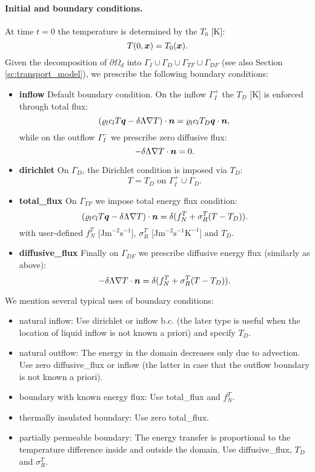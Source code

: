 


\paragraph{Initial and boundary conditions.}
At time $t=0$ the temperature is determined by the  $T_0$ [K]:
\[ T(0,\mathbf{\boldsymbol{x}}) = T_0(\mathbf{\boldsymbol{x}}). \]
Given the decomposition of $\partial\Omega_d$ into $\Gamma_I\cup\Gamma_D\cup\Gamma_{TF}\cup\Gamma_{DF}$ (see also Section \ref{sc:transport_model}), we prescribe the following boundary conditions:
\begin{itemize}
\item \textbf{inflow} Default boundary condition. On the inflow $\Gamma_I^+$ the  $T_D$ [K] is enforced through total flux:
\[ \left(\varrho_l c_l T \mathbf{\boldsymbol{q}} - \delta\Lambda\nabla T\right)\cdot\mathbf{\boldsymbol{n}} = \varrho_l c_l T_D\mathbf{\boldsymbol{q}}\cdot\mathbf{\boldsymbol{n}}, \]
while on the outflow $\Gamma_I^-$ we prescribe zero diffusive flux:
\[ -\delta\Lambda\nabla T\cdot\mathbf{\boldsymbol{n}} = 0. \] 
\item \textbf{dirichlet} On $\Gamma_D$, the Dirichlet condition is imposed via  $T_D$:
\[ T = T_D \mbox{ on }\Gamma_I^+\cup\Gamma_D. \]
\item \textbf{total\_flux}
On $\Gamma_{TF}$ we impose total energy flux condition:
\[ \left(\varrho_l c_l T \mathbf{\boldsymbol{q}} - \delta\Lambda\nabla T\right)\cdot\mathbf{\boldsymbol{n}} = \delta(f^T_N+\sigma^T_R(T-T_D)). \]
with user-defined  $f^T_N$ [J$\mathrm{m}^{-2}\mathrm{s}^{-1}$],
 $\sigma^T_R$ [J$\mathrm{m}^{-2}\mathrm{s}^{-1}\mathrm{K}^{-1}$] and  $T_D$.
\item \textbf{diffusive\_flux} Finally on $\Gamma_{DF}$ we prescribe diffusive energy flux (similarly as above):
\[ -\delta\Lambda\nabla T\cdot\mathbf{\boldsymbol{n}} = \delta(f^T_N+\sigma^T_R(T-T_D)). \]
\end{itemize}
We mention several typical uses of boundary conditions:
\begin{itemize}
\item natural inflow: Use dirichlet or inflow b.c. (the later type is useful when the location of liquid inflow is not known a priori) and specify $T_D$.
\item natural outflow: The energy in the domain decreases only due to advection. Use zero diffusive\_flux or inflow (the latter in case that the outflow boundary is not known a priori).
\item boundary with known energy flux: Use total\_flux and $f_N^T$.
\item thermally insulated boundary: Use zero total\_flux.
\item partially permeable boundary: The energy transfer is proportional to the temperature difference inside and outside the domain.
Use diffusive\_flux, $T_D$ and $\sigma_R^T$.
\end{itemize}







